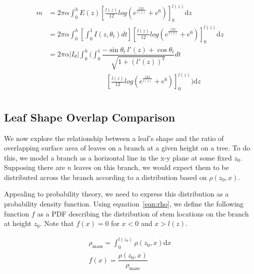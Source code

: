 \documentclass[10pt]{article}
\numberwithin{equation}{subsection}
\begin{document}
\begin{center}
  \begin{equation}
    \begin{split}
      m &= 2\pi\alpha \int_0^{h}
      E(z) \left[ \frac{l(z)}{12} log\left( e^{\frac{12x}{l(z)}} + e^6 \right) \right]_0^{l(z)} \mathrm{d}z \\
      &= 2\pi\alpha \int_0^{h}
      \left[\int_0^1 I(z,\theta_{t})dt\right]
      \left[ \frac{l(z)}{12} log\left( e^{\frac{12x}{l(z)}} + e^6 \right) \right]_0^{l(z)} \mathrm{d}z \\
      &= 2\pi\alpha |I_\theta| \int_0^{h}
      \bigg(\int_0^1 \dfrac{-\sin\theta_t \  l'(z) + \cos\theta_t}{\sqrt{1+(l'(z))^2}} dt \\
      & \;\;\;\;\;\;\;\;\;\;\;\;\;\;\;\;\;\;\;\;\;\;\;\;\;\;\;\;\;\;\left[ \frac{l(z)}{12} log\left( e^{\frac{12x}{l(z)}} + e^6 \right) \right]_0^{l(z)} \bigg) \mathrm{d}z \\
    \end{split}
  \end{equation}
\end{center}

  
\subsection{Leaf Shape Overlap Comparison}

We now explore the relationship between a leaf's shape and the ratio
of overlapping surface area of leaves on a branch at a given height on
a tree. To do this, we model a branch as a horizontal line in the x-y
plane at some fixed $z_0$. Supposing there are $n$ leaves on this
branch, we would expect them to be distributed across the branch
according to a distribution based on $\rho(z_0,x)$.

Appealing to probability theory, we need to express this distribution
as a probability density function. Using equation~\eqref{eqn:rho}, we
define the following function $f$ as a PDF describing the distribution
of stem locations on the branch at height $z_0$. Note that $f(x) = 0$
for $x < 0$ and $x > l(z)$.

\begin{center}
  \begin{gather}
    \rho_{\mathrm{mass}} = \int_0^{l(z_0)}\rho(z_0,x)\mathrm{d}x \nonumber \\ 
    f(x) = \dfrac{\rho(z_0,x)}{\rho_{\mathrm{mass}}} \label{eqn:fx}
  \end{gather}
\end{center}
\end{document}
